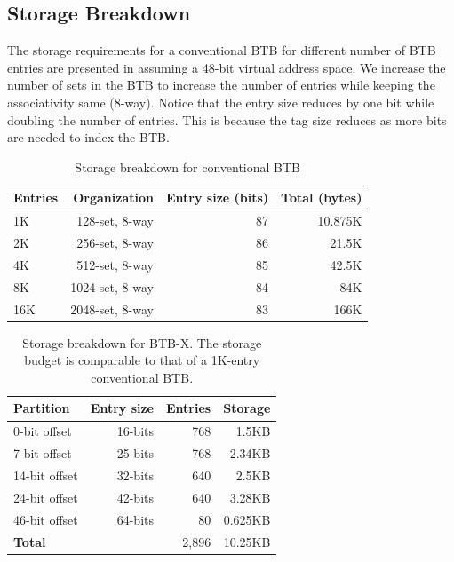 \subsection{Storage Breakdown}

The storage requirements for a conventional BTB for different number of BTB entries are presented in  assuming a 48-bit virtual address space. We increase the number of sets in the BTB to increase the number of entries while keeping the associativity same (8-way). Notice that the entry size reduces by one bit while doubling the number of entries. This is because the tag size reduces as more bits are needed to index the BTB.

\begin{scriptsize}
\begin{table}[t!]
  \centering
  \caption{Storage breakdown for conventional BTB}
  \label{table:metadata}
  \vspace{-0.1in}
  \begin{tabular}{lrrr} \hline
    \textbf{Entries} & \textbf{Organization} & \textbf{Entry size (bits)}
    & \textbf{Total (bytes)} \\\hline
    1K & 128-set, 8-way & 87 & 10.875K\\\hline
    2K & 256-set, 8-way & 86 & 21.5K\\\hline
    4K & 512-set, 8-way & 85 & 42.5K\\\hline
    8K & 1024-set, 8-way & 84 & 84K\\\hline
    16K & 2048-set, 8-way & 83 & 166K\\\hline
  \end{tabular}
\end{table}
\end{scriptsize}

\begin{scriptsize}
\begin{table}[t!]
  \centering
  \caption{Storage breakdown for BTB-X. The storage budget is comparable to that of a 1K-entry conventional BTB.}
  \label{table:metadata-fdipx}
  \vspace{-0.1in}

    \begin{tabular}{lrrr} \hline
    \textbf{Partition}&\textbf{Entry size}&\textbf{Entries}&\textbf{Storage}\\\hline
    0-bit offset&16-bits&768&1.5KB\\
    7-bit offset&25-bits&768&2.34KB\\
    14-bit offset&32-bits&640&2.5KB\\
    24-bit offset&42-bits&640&3.28KB \\
    46-bit offset&64-bits&80& 0.625KB\\\hline
    \textbf{Total}&&2,896&10.25KB\\\hline
    \end{tabular}

\end{table}
\end{scriptsize}

